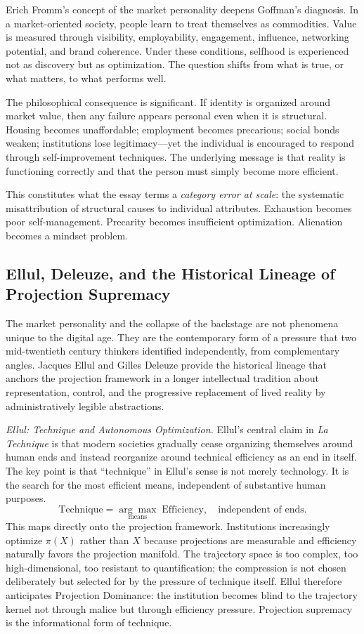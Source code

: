 \documentclass[12pt, a4paper]{article}
\theoremstyle{plain}
\theoremstyle{definition}
\theoremstyle{remark}
\begin{document}
Erich Fromm's concept of the market personality deepens Goffman's diagnosis.
In a market-oriented society, people learn to treat themselves as commodities.
Value is measured through visibility, employability, engagement, influence,
networking potential, and brand coherence.
Under these conditions, selfhood is experienced not as discovery but as optimization.
The question shifts from what is true, or what matters, to what performs well.

The philosophical consequence is significant.
If identity is organized around market value, then any failure appears personal
even when it is structural.
Housing becomes unaffordable; employment becomes precarious; social bonds weaken;
institutions lose legitimacy---yet the individual is encouraged to respond through
self-improvement techniques.
The underlying message is that reality is functioning correctly and that the person
must simply become more efficient.

This constitutes what the essay terms a \emph{category error at scale}:
the systematic misattribution of structural causes to individual attributes.
Exhaustion becomes poor self-management.
Precarity becomes insufficient optimization.
Alienation becomes a mindset problem.

\subsection{Ellul, Deleuze, and the Historical Lineage of Projection Supremacy}

The market personality and the collapse of the backstage are not phenomena unique
to the digital age.
They are the contemporary form of a pressure that two mid-twentieth century thinkers
identified independently, from complementary angles.
Jacques Ellul and Gilles Deleuze provide the historical lineage that anchors the
projection framework in a longer intellectual tradition about representation, control,
and the progressive replacement of lived reality by administratively legible abstractions.

\textit{Ellul: Technique and Autonomous Optimization.}
Ellul's central claim in \textit{La Technique} is that modern societies gradually
cease organizing themselves around human ends and instead reorganize around technical
efficiency as an end in itself.
The key point is that ``technique'' in Ellul's sense is not merely technology.
It is the search for the most efficient means, independent of substantive human purposes.
\[
\text{Technique} = \underset{\text{means}}{\arg\max}\;\text{Efficiency},
\quad \text{independent of ends.}
\]
This maps directly onto the projection framework.
Institutions increasingly optimize $\pi(X)$ rather than $X$ because projections
are measurable and efficiency naturally favors the projection manifold.
The trajectory space is too complex, too high-dimensional, too resistant to
quantification; the compression is not chosen deliberately but selected for by
the pressure of technique itself.
Ellul therefore anticipates Projection Dominance: the institution becomes blind
to the trajectory kernel not through malice but through efficiency pressure.
Projection supremacy is the informational form of technique.
\end{document}
